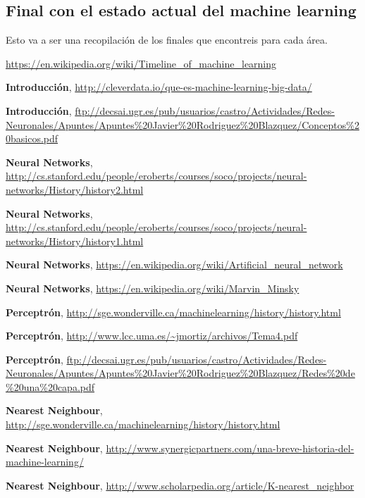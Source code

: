 \documentclass[a4paper, 11pt]{article} %
\begin{document}
\subsection{Final con el estado actual del machine learning}
Esto va a ser una recopilación de los finales que encontreis para cada área.
\begin{thebibliography}{9}

 \url{https://en.wikipedia.org/wiki/Timeline_of_machine_learning}

 	\textbf{Introducción},
 \url{http://cleverdata.io/que-es-machine-learning-big-data/}
 
 	\textbf{Introducción},
 \url{ftp://decsai.ugr.es/pub/usuarios/castro/Actividades/Redes-Neuronales/Apuntes/Apuntes%20Javier%20Rodriguez%20Blazquez/Conceptos%20basicos.pdf}

	\textbf{Neural Networks},
  \url{http://cs.stanford.edu/people/eroberts/courses/soco/projects/neural-networks/History/history2.html}
 
 	\textbf{Neural Networks},
 \url{http://cs.stanford.edu/people/eroberts/courses/soco/projects/neural-networks/History/history1.html}
 
 	\textbf{Neural Networks},
 \url{https://en.wikipedia.org/wiki/Artificial_neural_network}
 
 	\textbf{Neural Networks},
 \url{https://en.wikipedia.org/wiki/Marvin_Minsky}
 
 	\textbf{Perceptrón},
 \url{http://sge.wonderville.ca/machinelearning/history/history.html}
 
 	\textbf{Perceptrón},
 \url{http://www.lcc.uma.es/~jmortiz/archivos/Tema4.pdf}
 
 	\textbf{Perceptrón},
 \url{ftp://decsai.ugr.es/pub/usuarios/castro/Actividades/Redes-Neuronales/Apuntes/Apuntes%20Javier%20Rodriguez%20Blazquez/Redes%20de%20una%20capa.pdf}
 
 	\textbf{Nearest Neighbour},
 \url{http://sge.wonderville.ca/machinelearning/history/history.html}
 
 	\textbf{Nearest Neighbour},
 \url{http://www.synergicpartners.com/una-breve-historia-del-machine-learning/}
 
 	\textbf{Nearest Neighbour},
 \url{http://www.scholarpedia.org/article/K-nearest_neighbor}
 

\end{thebibliography}
\end{document}

